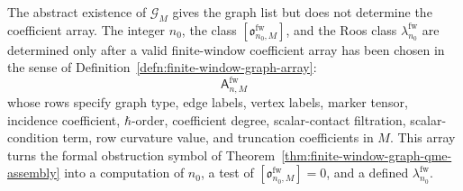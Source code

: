 \begin{thm}
  The abstract existence of \(\mathcal G_M\) gives the graph list but
  does not determine the coefficient array.  The integer \(n_0\), the
  class \([\mathfrak o^{\mathrm{fw}}_{n_0,M}]\), and the Roos class
  \(\lambda^{\mathrm{fw}}_{n_0}\) are determined only after a valid
  finite-window coefficient array has been chosen in the sense of
  Definition~\ref{defn:finite-window-graph-array}:
  \[
    \mathsf A^{\mathrm{fw}}_{n,M}
  \]
  whose rows specify graph type, edge labels, vertex labels, marker tensor,
  incidence coefficient, \(\hbar\)-order, coefficient degree,
  scalar-contact filtration, scalar-condition term, row curvature value, and
  truncation coefficients in \(M\).  This array turns the formal
  obstruction symbol of
  Theorem~\ref{thm:finite-window-graph-qme-assembly} into a computation of
  \(n_0\), a test of
  \([\mathfrak o^{\mathrm{fw}}_{n_0,M}]=0\), and a defined
  \(\lambda^{\mathrm{fw}}_{n_0}\).
\end{thm}

